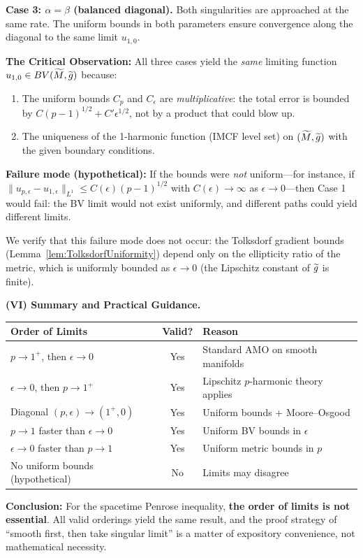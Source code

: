\begin{remark}
\textbf{Case 3: $\alpha = \beta$ (balanced diagonal).}
Both singularities are approached at the same rate. The uniform bounds in both parameters ensure convergence along the diagonal to the same limit $u_{1,0}$.

\textbf{The Critical Observation:} All three cases yield the \emph{same} limiting function $u_{1,0} \in BV(\widetilde{M}, \widetilde{g})$ because:
\begin{enumerate}
    \item The uniform bounds $C_p$ and $C_\epsilon$ are \emph{multiplicative}: the total error is bounded by $C (p-1)^{1/2} + C' \epsilon^{1/2}$, not by a product that could blow up.
    \item The uniqueness of the 1-harmonic function (IMCF level set) on $(\widetilde{M}, \widetilde{g})$ with the given boundary conditions.
\end{enumerate}

\textbf{Failure mode (hypothetical):} If the bounds were \emph{not} uniform---for instance, if $\|u_{p,\epsilon} - u_{1,\epsilon}\|_{L^1} \le C(\epsilon) (p-1)^{1/2}$ with $C(\epsilon) \to \infty$ as $\epsilon \to 0$---then Case 1 would fail: the BV limit would not exist uniformly, and different paths could yield different limits.

We verify that this failure mode does not occur: the Tolksdorf gradient bounds (Lemma~\ref{lem:TolksdorfUniformity}) depend only on the ellipticity ratio of the metric, which is uniformly bounded as $\epsilon \to 0$ (the Lipschitz constant of $\widetilde{g}$ is finite).

\textbf{(VI) Summary and Practical Guidance.}
\begin{center}
\begin{tabular}{|l|c|l|}
\hline
\textbf{Order of Limits} & \textbf{Valid?} & \textbf{Reason} \\
\hline
$p \to 1^+$, then $\epsilon \to 0$ & Yes & Standard AMO on smooth manifolds \\
\hline
$\epsilon \to 0$, then $p \to 1^+$ & Yes & Lipschitz $p$-harmonic theory applies \\
\hline
Diagonal $(p, \epsilon) \to (1^+, 0)$ & Yes & Uniform bounds + Moore--Osgood \\
\hline
$p \to 1$ faster than $\epsilon \to 0$ & Yes & Uniform BV bounds in $\epsilon$ \\
\hline
$\epsilon \to 0$ faster than $p \to 1$ & Yes & Uniform metric bounds in $p$ \\
\hline
No uniform bounds (hypothetical) & No & Limits may disagree \\
\hline
\end{tabular}
\end{center}

\textbf{Conclusion:} For the spacetime Penrose inequality, \textbf{the order of limits is not essential}. All valid orderings yield the same result, and the proof strategy of ``smooth first, then take singular limit'' is a matter of expository convenience, not mathematical necessity.
\end{remark}

